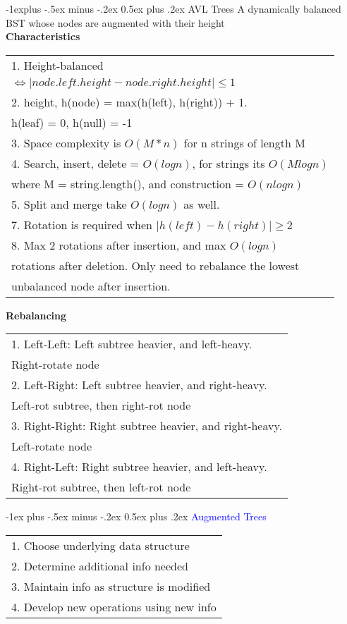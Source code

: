 \documentclass[10pt,landscape]{article}
\makeatletter
\renewcommand{\section}{\@startsection{section}{1}{0mm}%
                                {-1ex plus -.5ex minus -.2ex}%
                                {0.5ex plus .2ex}%
                                {\normalfont\large\bfseries}}
\renewcommand{\subsection}{\@startsection{subsection}{2}{0mm}%
                                {-1explus -.5ex minus -.2ex}%
                                {0.5ex plus .2ex}%
                                {\normalfont\normalsize\bfseries}}
\makeatother
\begin{document}
\begin{multicols}{3}
\subsection{AVL Trees} 
A dynamically balanced BST whose nodes are augmented with their height \\ 
\textbf{Characteristics} \\
\begin{tabular}{l}
1. Height-balanced \\ $\iff \lvert node.left.height - node.right.height \rvert \leq 1$ \\ 
2. height, h(node) = max(h(left), h(right)) + 1. \\ h(leaf) = 0, h(null) = -1 \\
3. Space complexity is $O(M * n)$ for n strings of length M \\ 
4. Search, insert, delete = $O(logn)$, for strings its $O(Mlogn)$ \\ where M = string.length(), and construction = $O(nlogn)$ \\
5. Split and merge take $O(logn)$ as well. \\ 
7. Rotation is required when $\lvert h(left) - h(right) \rvert \geq 2$ \\
8. Max 2 rotations after insertion, and max $O(logn)$ \\ rotations after deletion. Only need to rebalance the lowest \\ unbalanced node after insertion.
\end{tabular}
\textbf{Rebalancing} \\ 
\begin{tabular}{l}
1. Left-Left: Left subtree heavier, and left-heavy. \\ Right-rotate node \\ 
2. Left-Right: Left subtree heavier, and right-heavy. \\ Left-rot subtree, then right-rot node \\ 
3. Right-Right: Right subtree heavier, and right-heavy. \\ Left-rotate node \\ 
4. Right-Left: Right subtree heavier, and left-heavy. \\ Right-rot subtree, then left-rot node \\
\end{tabular}

\section{\textcolor{blue}{Augmented Trees}}
\begin{tabular}{l}
1. Choose underlying data structure \\ 
2. Determine additional info needed \\ 
3. Maintain info as structure is modified \\ 
4. Develop new operations using new info 
\end{tabular}


\end{multicols}
\end{document}
